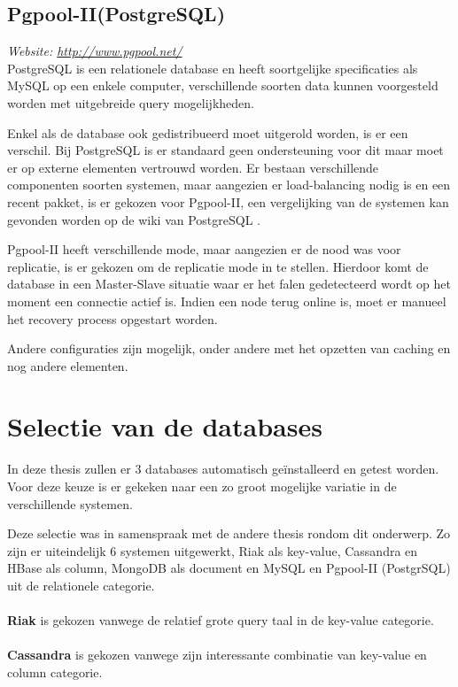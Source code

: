 \subsection{Pgpool-II(PostgreSQL)}
\textit{Website: \url{http://www.pgpool.net/}}\\
PostgreSQL is een relationele database en heeft soortgelijke specificaties als MySQL op een enkele computer, verschillende soorten data kunnen voorgesteld worden met uitgebreide query mogelijkheden. 

Enkel als de database ook gedistribueerd moet uitgerold worden, is er een verschil. Bij PostgreSQL is er standaard geen ondersteuning voor dit maar moet er op externe elementen vertrouwd worden. Er bestaan verschillende componenten soorten systemen, maar aangezien er load-balancing nodig is en een recent pakket, is er gekozen voor Pgpool-II, een vergelijking van de systemen kan gevonden worden op de wiki van PostgreSQL \cite{postgresql-clustering}. 

Pgpool-II heeft verschillende mode, maar aangezien er de nood was voor replicatie, is er gekozen om de replicatie mode in te stellen. Hierdoor komt de database in een Master-Slave situatie waar er het falen gedetecteerd wordt op het moment een connectie actief is. Indien een node terug online is, moet er manueel het recovery process opgestart worden. 

Andere configuraties zijn mogelijk, onder andere met het opzetten van caching en nog andere elementen. 

\section{Selectie van de databases}
In deze thesis zullen er 3 databases automatisch geïnstalleerd en getest worden. Voor deze keuze is er gekeken naar een zo groot mogelijke variatie in de verschillende systemen.

Deze selectie was in samenspraak met de andere thesis rondom dit onderwerp. Zo zijn er uiteindelijk 6 systemen uitgewerkt, Riak als key-value, Cassandra en HBase als column, MongoDB als document en MySQL en Pgpool-II (PostgrSQL) uit de relationele categorie.

\paragraph{} \textbf{Riak} is gekozen vanwege de relatief grote query taal in de key-value categorie. 

\paragraph{} \textbf{Cassandra} is gekozen vanwege zijn interessante combinatie van key-value en column categorie. 


